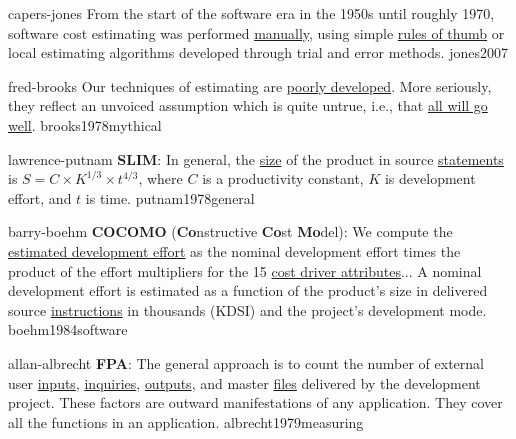 \documentclass{article}
\begin{document}

\lnQuote
  {capers-jones}
  {From the start of the software era in the 1950s until roughly 1970, software cost estimating was performed \ul{manually}, using simple \ul{rules of thumb} or local estimating algorithms developed through trial and error methods.}
  {jones2007}

\lnQuote
  {fred-brooks}
  {Our techniques of estimating are \ul{poorly developed}. More seriously, they reflect an unvoiced assumption which is quite untrue, i.e., that \ul{all will go well}.}
  {brooks1978mythical}

\lnQuote
  {lawrence-putnam}
  {\textbf{SLIM}: In general, the \ul{size} of the product in source \ul{statements} is \(S = C \times K^{1/3} \times t^{4/3}\), where \(C\) is a productivity constant, \(K\) is development effort, and \(t\) is time.}
  {putnam1978general}

\lnQuote
  {barry-boehm}
  {\textbf{COCOMO} (\textbf{Co}nstructive \textbf{Co}st \textbf{Mo}del): We compute the \ul{estimated development effort} as the nominal development effort times the product of the effort multipliers for the 15 \ul{cost driver attributes}... A nominal development effort is estimated as a function of the product's size in delivered source \ul{instructions} in thousands (KDSI) and the project's development mode.}
  {boehm1984software}

\lnQuote
  {allan-albrecht}
  {\textbf{FPA}: The general approach is to count the number of external user \ul{inputs}, \ul{inquiries}, \ul{outputs}, and master \ul{files} delivered by the development project. These factors are outward manifestations of any application. They cover all the functions in an application.}
  {albrecht1979measuring}

\end{document}
